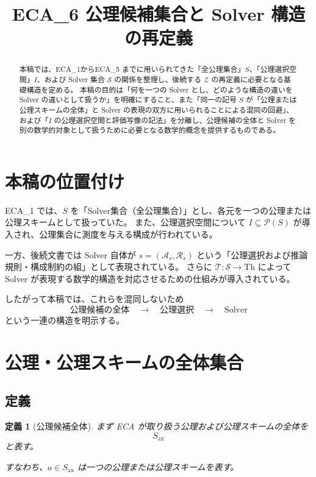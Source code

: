 \documentclass[a4paper,11pt]{article}
\title{ECA_6 公理候補集合と Solver 構造の再定義}
\author{}
\date{}
\newtheorem{definition}{定義}[section]
\newcommand{\Ax}{S_{\mathrm{ax}}}
\begin{document}
\maketitle

\begin{abstract}
本稿では、ECA_1からECA_5 までに用いられてきた「全公理集合」$S$、「公理選択空間」$I$、および Solver 集合 $\mathcal{S}$ の関係を整理し、後続する $\mathcal{Z}$ の再定義に必要となる基礎構造を定める。
本稿の目的は「何を一つの Solver とし、どのような構造の違いを Solver の違いとして扱うか」を明確にすること、また「同一の記号 $S$ が「公理または公理スキームの全体」と Solver の表現の双方に用いられることによる混同の回避」、および「$I$ の公理選択空間と評価写像の記法」を分離し、公理候補の全体と Solver を別の数学的対象として扱うために必要となる数学的概念を提供するものである。
\end{abstract}

\section{本稿の位置付け}

ECA_1 では、$S$ を「Solver集合（全公理集合）」とし、各元を一つの公理または公理スキームとして扱っていた。
また、公理選択空間について $I\subseteq\mathcal{P}(S)$ が導入され、公理集合に測度を与える構成が行われている。

一方、後続文書では Solver 自体が $s=(\mathcal{A}_s,\mathcal{R}_s)$ という「公理選択および推論規則・構成制約の組」として表現されている。
さらに $\mathcal{T}:\mathcal{S}\longrightarrow\mathrm{Th}$ によって Solver が表現する数学的構造を対応させるための仕組みが導入されている。

したがって本稿では、これらを混同しないため
\[
\boxed{
\text{公理候補の全体}
\quad\longrightarrow\quad
\text{公理選択}
\quad\longrightarrow\quad
\text{Solver}
}
\]
という一連の構造を明示する。

\section{公理・公理スキームの全体集合}

\subsection{定義}

\begin{definition}[公理候補全体]
まず ECA が取り扱う公理および公理スキームの全体を
\[
\boxed{\Ax}
\]
と表す。

すなわち、$a\in\Ax$ は一つの公理または公理スキームを表す。
\end{definition}
\end{document}

